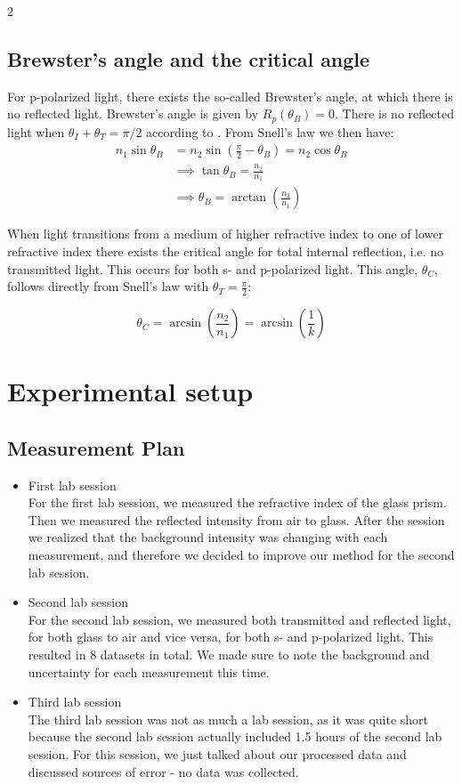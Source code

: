 \documentclass[a4paper,oneside,article]{memoir}
\begin{document}
\begin{multicols}{2}
\section{Brewster's angle and the critical angle}
For p-polarized light, there exists the so-called Brewster's angle, at which there is no reflected light. Brewster's angle is given by $R_p(\theta_B)=0$. There is no reflected light when $\theta_I+\theta_T=\pi/2$ according to \cite{griff}. From Snell's law we then have:
\begin{align}
    n_1\sin\theta_B&=n_2\sin\left(\frac{\pi}{2}-\theta_B\right)=n_2\cos\theta_B \nonumber \\
    &\implies\tan\theta_B = \frac{n_2}{n_1} \nonumber \\
    &\implies\theta_B = \arctan\left(\frac{n_2}{n_1}\right) \label{eq:brew}
\end{align}

When light transitions from a medium of higher refractive index to one of lower refractive index there exists the critical angle for total internal reflection, i.e. no transmitted light. This occurs for both s- and p-polarized light. This angle, $\theta_C$, follows directly from Snell's law with $\theta_T = \frac{\pi}{2}$:

\begin{equation} \label{eq:crit}
    \theta_C = \arcsin\left(\frac{n_2}{n_1}\right)=\arcsin\left(\frac{1}{k}\right)
\end{equation}

\newpage

\chapter{Experimental setup}

\section{Measurement Plan}
\begin{itemize}
\item First lab session \\
For the first lab session, we measured the refractive index of the glass prism.
Then we measured the reflected intensity from air to glass. 
After the session we realized that the background intensity was changing with each measurement,
and therefore we decided to improve our method for the second lab session.
\item Second lab session \\
For the second lab session, we measured both transmitted and reflected light, for both glass to air and vice versa, for both s- and p-polarized light. 
This resulted in 8 datasets in total. We made sure to note the background and uncertainty for each measurement this time.
\item Third lab session \\
The third lab session was not as much a lab session, as it was quite short because the second lab session actually included 1.5 hours of the second lab session. 
For this session, we just talked about our processed data and discussed sources of error - no data was collected.
\end{itemize}


\end{multicols}
\end{document}
